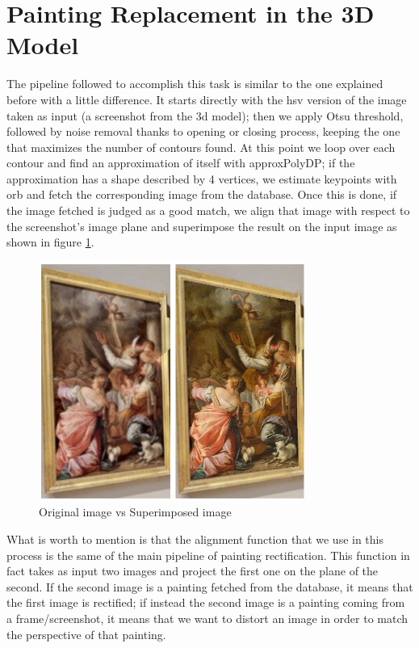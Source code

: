\documentclass[conference]{IEEEtran}
\begin{document}
\section{Painting Replacement in the 3D Model}
The pipeline followed to accomplish this task is similar to the one explained before with a little difference. It starts directly with the hsv version of the image taken as input (a screenshot from the 3d model); then we apply Otsu threshold, followed by noise removal thanks to opening or closing process, keeping the one that maximizes the number of contours found. At this point we loop over each contour and find an approximation of itself with approxPolyDP; if the approximation has a shape described by 4 vertices, we estimate keypoints with orb and fetch the corresponding image from the database. Once this is done, if the image fetched is judged as a good match, we align that image with respect to the screenshot’s image plane and superimpose the result on the input image as shown in figure \ref{fig_3d_model}.

\begin{figure}[htbp]
\centerline{\includegraphics[width=0.8\columnwidth]{../3DModel/collage_06.jpg}}
\caption{Original image vs Superimposed image}
\label{fig_3d_model}
\end{figure}

What is worth to mention is that the alignment function that we use in this process is the same of the main pipeline of painting rectification. This function in fact takes as input two images and project the first one on the plane of the second. If the second image is a painting fetched from the database, it means that the first image is rectified; if instead the second image is a painting coming from a frame/screenshot, it means that we want to distort an image in order to match the perspective of that painting.\\
\end{document}

